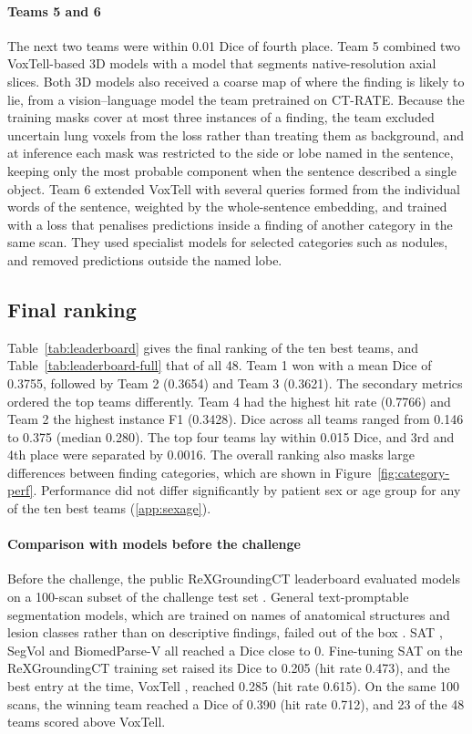 \documentclass[final,5p,times,twocolumn,authoryear,numafflabel]{elsarticle}
\begin{document}
\paragraph{Teams 5 and 6} The next two teams were within 0.01 Dice of
fourth place. Team 5 combined two VoxTell-based 3D models with a model that
segments native-resolution axial slices. Both 3D models also received a coarse
map of where the finding is likely to lie, from a vision--language model the
team pretrained on CT-RATE. Because the training masks cover at most three
instances of a finding, the team excluded uncertain lung voxels from the loss
rather than treating them as background, and at inference each mask was
restricted to the side or lobe named in the sentence, keeping only the most
probable component when the sentence described a single object. Team 6 extended
VoxTell with several queries formed from the individual words of the sentence,
weighted by the whole-sentence embedding, and trained with a loss that
penalises predictions inside a finding of another category in the same scan. They used
specialist models for selected categories such as nodules, and removed
predictions outside the named lobe.

\subsection{Final ranking}
\label{sec:ranking}
Table~\ref{tab:leaderboard} gives the final ranking of the ten best teams, and
Table~\ref{tab:leaderboard-full} that of all 48. Team 1 won with a mean Dice of
0.3755, followed by Team 2 (0.3654) and Team 3 (0.3621). The secondary metrics
ordered the top teams differently. Team 4 had the highest hit rate (0.7766) and
Team 2 the highest instance F1 (0.3428).
Dice across all teams ranged from 0.146 to 0.375 (median
0.280). The top four teams lay within 0.015 Dice, and
3rd and 4th place were separated by 0.0016. The overall ranking also masks large
differences between finding categories, which are shown in
Figure~\ref{fig:category-perf}. Performance did not differ significantly by
patient sex or age group for any of the ten best teams (\ref{app:sexage}).

\paragraph{Comparison with models before the challenge} Before the challenge,
the public ReXGroundingCT leaderboard evaluated models on a 100-scan
subset of the challenge test set \citep{baharoon2026rexgroundingct}. General
text-promptable segmentation models, which are trained on names of anatomical
structures and lesion classes rather than on descriptive findings, failed out
of the box \citep{baharoon2025state}. SAT \citep{zhao2025large}, SegVol \citep{du2024segvol} and
BiomedParse-V \citep{zhao2025biomedparse} all reached a Dice close to 0. Fine-tuning SAT on the ReXGroundingCT training set raised its Dice
to 0.205 (hit rate 0.473), and the best entry at the time, VoxTell
\citep{rokuss2026voxtell}, reached 0.285 (hit rate 0.615). On the
same 100 scans, the winning team reached a Dice of 0.390 (hit rate
0.712), and 23 of the 48 teams scored above VoxTell.
\end{document}
